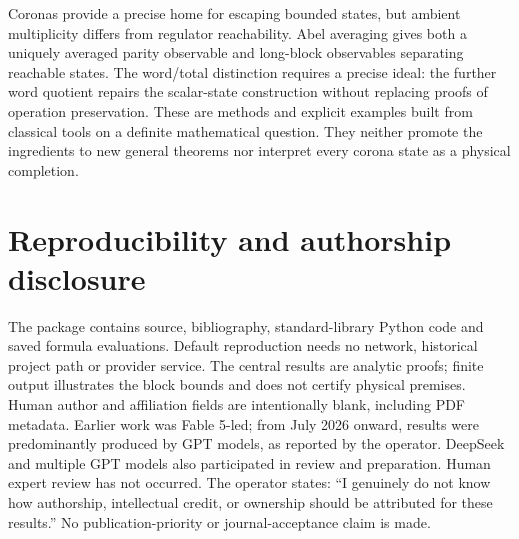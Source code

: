 \documentclass[11pt]{article}
\theoremstyle{definition}
\begin{document}
Coronas provide a precise home for escaping bounded states, but ambient multiplicity differs from regulator reachability.
Abel averaging gives both a uniquely averaged parity observable and long-block observables separating reachable states.
The word/total distinction requires a precise ideal: the further word quotient repairs the scalar-state construction without replacing proofs of operation preservation.
These are methods and explicit examples built from classical tools on a definite mathematical question.
They neither promote the ingredients to new general theorems nor interpret every corona state as a physical completion.

\section*{Reproducibility and authorship disclosure}

The package contains source, bibliography, standard-library Python code and saved formula evaluations.
Default reproduction needs no network, historical project path or provider service.
The central results are analytic proofs; finite output illustrates the block bounds and does not certify physical premises.
Human author and affiliation fields are intentionally blank, including PDF metadata.
Earlier work was Fable 5-led; from July 2026 onward, results were predominantly produced by GPT models, as reported by the operator.
DeepSeek and multiple GPT models also participated in review and preparation.
Human expert review has not occurred.
The operator states: ``I genuinely do not know how authorship, intellectual credit, or ownership should be attributed for these results.''
No publication-priority or journal-acceptance claim is made.


\end{document}
